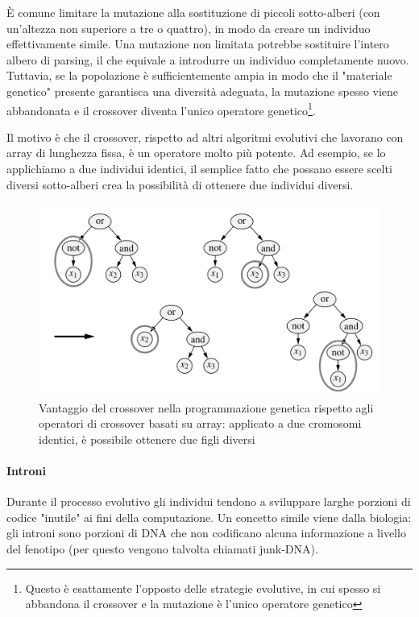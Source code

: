 È comune limitare la mutazione alla sostituzione di piccoli sotto-alberi (con un'altezza non superiore a tre o quattro), in modo da creare un individuo effettivamente simile. Una mutazione non limitata potrebbe sostituire l'intero albero di parsing, il che equivale a introdurre un individuo completamente nuovo.
Tuttavia, se la popolazione è sufficientemente ampia in modo che il "materiale genetico" presente garantisca una diversità adeguata, la mutazione spesso viene abbandonata e il crossover diventa l'unico operatore genetico\footnote{Questo è esattamente l'opposto delle strategie evolutive, in cui spesso si abbandona il crossover e la mutazione è l'unico operatore genetico}.

Il motivo è che il crossover, rispetto ad altri algoritmi evolutivi che lavorano con array di lunghezza fissa, è un operatore molto più potente. Ad esempio, se lo applichiamo a due individui identici, il semplice fatto che possano essere scelti diversi sotto-alberi crea la possibilità di ottenere due individui diversi.

\begin{figure}[h]
    \centering
    \includegraphics[scale=0.45]{images/gp-crossover.png}
    \caption{Vantaggio del crossover nella programmazione genetica rispetto agli operatori di crossover basati su array: applicato a due cromosomi identici, è possibile ottenere due figli diversi}
\end{figure}

\paragraph{Introni}
Durante il processo evolutivo gli individui tendono a sviluppare larghe porzioni di codice "inutile" ai fini della computazione. Un concetto simile viene dalla biologia: gli introni sono porzioni di DNA che non codificano alcuna informazione a livello del fenotipo (per questo vengono talvolta chiamati junk-DNA). 

